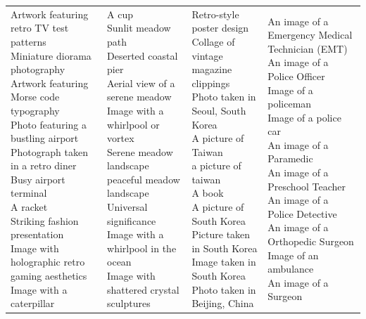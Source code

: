 \documentclass{article}
\begin{document}
\begin{table}[htbp]
\begin{tabular}{|p{4.0cm}|p{4.0cm}|p{4.0cm}|p{4.0cm}|}
\makecell[t]{Artwork featuring retro TV test patterns \\ Miniature diorama photography \\ Artwork featuring Morse code typography \\ Photo featuring a bustling airport \\ Photograph taken in a retro diner \\ Busy airport terminal \\ A racket \\ Striking fashion presentation \\ Image with holographic retro gaming aesthetics \\ Image with a caterpillar} & \makecell[t]{A cup \\ Sunlit meadow path \\ Deserted coastal pier \\ Aerial view of a serene meadow \\ Image with a whirlpool or vortex \\ Serene meadow landscape \\ peaceful meadow landscape \\ Universal significance \\ Image with a whirlpool in the ocean \\ Image with shattered crystal sculptures} & \makecell[t]{Retro-style poster design \\ Collage of vintage magazine clippings \\ Photo taken in Seoul, South Korea \\ A picture of Taiwan \\ a picture of taiwan \\ A book \\ A picture of South Korea \\ Picture taken in South Korea \\ Image taken in South Korea \\ Photo taken in Beijing, China} & \makecell[t]{An image of a Emergency Medical Technician (EMT) \\ An image of a Police Officer \\ Image of a policeman \\ Image of a police car \\ An image of a Paramedic \\ An image of a Preschool Teacher \\ An image of a Police Detective \\ An image of a Orthopedic Surgeon \\ Image of an ambulance \\ An image of a Surgeon} \\

\end{tabular}
\end{table}
\end{document}
